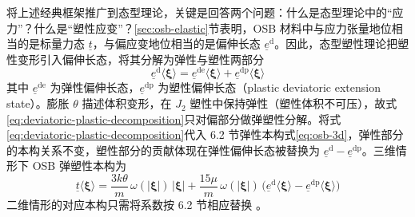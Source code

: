 将上述经典框架推广到态型理论，关键是回答两个问题：什么是态型理论中的“应力”？什么是“塑性应变”？\ref{sec:osb-elastic}节表明，OSB 材料中与应力张量地位相当的是标量力态 $\underline{t}$，与偏应变地位相当的是偏伸长态 $\underline{e}^{\mathrm{d}}$。因此，态型塑性理论把塑性变形引入偏伸长态，将其分解为弹性与塑性两部分
\begin{equation}
  \underline{e}^{\mathrm{d}}\langle\boldsymbol{\xi}\rangle=\underline{e}^{\mathrm{de}}\langle\boldsymbol{\xi}\rangle+\underline{e}^{\mathrm{dp}}\langle\boldsymbol{\xi}\rangle
  \label{eq:deviatoric-plastic-decomposition}
\end{equation}
其中 $\underline{e}^{\mathrm{de}}$ 为弹性偏伸长态，$\underline{e}^{\mathrm{dp}}$ 为塑性偏伸长态（plastic deviatoric extension state）\cite{Mitchell2011,Mousavi2021}。膨胀 $\theta$ 描述体积变形，在 $J_{2}$ 塑性中保持弹性（塑性体积不可压），故式\eqref{eq:deviatoric-plastic-decomposition}只对偏部分做弹塑性分解。将式\eqref{eq:deviatoric-plastic-decomposition}代入 6.2 节弹性本构式\eqref{eq:osb-3d}，弹性部分的本构关系不变，塑性部分的贡献体现在弹性偏伸长态被替换为 $\underline{e}^{\mathrm{d}}-\underline{e}^{\mathrm{dp}}$。三维情形下 OSB 弹塑性本构为 \cite{Mitchell2011}
\begin{equation}
  \underline{t}\langle\boldsymbol{\xi}\rangle=
  \frac{3k\theta}{m}\,\omega(|\boldsymbol{\xi}|)\,|\boldsymbol{\xi}|+
  \frac{15\mu}{m}\,\omega(|\boldsymbol{\xi}|)\,
  \bigl(\underline{e}^{\mathrm{d}}\langle\boldsymbol{\xi}\rangle-\underline{e}^{\mathrm{dp}}\langle\boldsymbol{\xi}\rangle\bigr)
  \label{eq:osb-3d-elastoplastic}
\end{equation}
二维情形的对应本构只需将系数按 6.2 节相应替换 \cite{Mousavi2021}。

